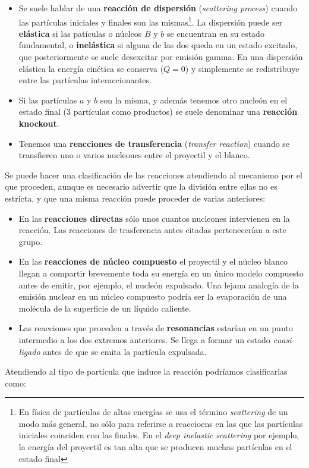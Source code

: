 \begin{itemize}
    \item Se suele hablar de una \textbf{reacción de dispersión} (\textit{scattering process}) cuando las partículas iniciales y finales son las mismas\footnote{En física de partículas de altas energías se usa el término \textit{scattering} de un modo más general, no sólo para referirse a reaccioens en las que las partículas iniciales coinciden con las finales. En el \textit{deep inelastic scattering} por ejemplo, la energía del proyectil es tan alta que se producen muchas partículas en el estado final}. La dispersión puede ser \textbf{elástica} si las patículas o núcleos $B$ y $b$ se encuentran en su estado fundamental, o \textbf{inelástica} si alguna de las dos queda en un estado excitado, que posteriormente se suele desexcitar por emisión gamma. En una dispersión elástica la energía cinética se conserva ($Q=0$) y simplemente se redistribuye entre las partículas interaccionantes.
    \item Si las partículas $a$ y $b$ son la misma, y además tenemos otro nucleón en el estado final (3 partículas como productos) se suele denominar una \textbf{reacción knockout}.
    \item Tenemos una \textbf{reacciones de transferencia} (\textit{transfer reaction}) cuando se transfieren uno o varios nucleones entre el proyectil y el blanco.
\end{itemize}


Se puede hacer una clasificación de las reacciones atendiendo al mecanismo por el que proceden, aunque es necesario advertir que la división entre ellas no es estricta, y que una misma reacción puede proceder de varias anteriores:

\begin{itemize}
    \item En las \textbf{reacciones directas} sólo unos cuantos nucleones intervienen en la reacción. Las reacciones de trasferencia antes citadas pertenecerían a este grupo.
    \item En las \textbf{reacciones de núcleo compuesto} el proyectil y el núcleo blanco llegan a compartir brevemente toda su energía en un único modelo compuesto antes de emitir, por ejemplo, el nucleón expulsado. Una lejana analogía de la emisión nuclear en un núcleo compuesto podría ser la evaporación de una molécula de la superficie de un líquido caliente.
    \item Las reacciones que proceden a través de \textbf{resonancias} estarían en un punto intermedio a los dos extremos anteriores. Se llega a formar un estado \textit{cuasi-ligado} antes de que se emita la partícula expulsada.
\end{itemize}
Atendiendo al tipo de partícula que induce la reacción podríamos clasificarlas como:

